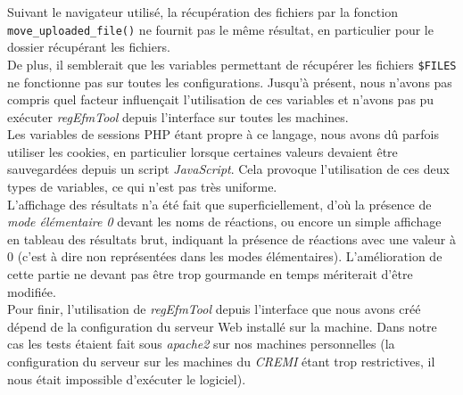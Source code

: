 Suivant le navigateur utilisé, la récupération des fichiers par la fonction \texttt{move\_uploaded\_file()} ne fournit pas le m\^eme résultat, en particulier pour le dossier récupérant les fichiers. \\
De plus, il semblerait que les variables permettant de récupérer les fichiers \texttt{\$FILES} ne fonctionne pas sur toutes les configurations. Jusqu'à présent, nous n'avons pas compris quel facteur influençait l'utilisation de ces variables et n'avons pas pu exécuter \textit{regEfmTool} depuis l'interface sur toutes les machines. \\
Les variables de sessions PHP étant propre à ce langage, nous avons d\^u parfois utiliser les cookies, en particulier lorsque certaines valeurs devaient \^etre sauvegardées depuis un script \emph{JavaScript}. Cela provoque l'utilisation de ces deux types de variables, ce qui n'est pas très uniforme. \\
L'affichage des résultats n'a été fait que superficiellement, d'où la présence de \textit{mode élémentaire 0} devant les noms de réactions, ou encore un simple affichage en tableau des résultats brut, indiquant la présence de réactions avec une valeur à 0 (c'est à dire non représentées dans les modes élémentaires). L'amélioration de cette partie ne devant pas être trop gourmande en temps mériterait d'\^etre modifiée. \\
Pour finir, l'utilisation de \textit{regEfmTool} depuis l'interface que nous avons créé dépend de la configuration du serveur Web installé sur la machine. Dans notre cas les tests étaient fait sous \emph{apache2} sur nos machines personnelles (la configuration du serveur sur les machines du \emph{CREMI} étant trop restrictives, il nous était impossible d'exécuter le logiciel).



